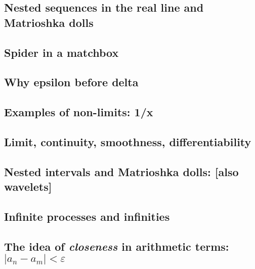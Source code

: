 \documentclass[
  a4paper,
]{article}
\begin{document}
\subsection{Nested sequences in the real line and Matrioshka
dolls}\label{nested-sequences-in-the-real-line-and-matrioshka-dolls}

\subsection{Spider in a matchbox}\label{spider-in-a-matchbox}

\subsection{Why epsilon before delta}\label{why-epsilon-before-delta}

\subsection{Examples of non-limits:
1/x}\label{examples-of-non-limits-1x}

\subsection{Limit, continuity, smoothness,
differentiability}\label{limit-continuity-smoothness-differentiability}

\subsection{Nested intervals and Matrioshka dolls: {[}also
wavelets{]}}\label{nested-intervals-and-matrioshka-dolls-also-wavelets}

\subsection{Infinite processes and
infinities}\label{infinite-processes-and-infinities}

\subsection{\texorpdfstring{The idea of \emph{closeness} in arithmetic
terms:
\(| a_n - a_m | < \varepsilon\)}{The idea of closeness in arithmetic terms: \textbar{} a\_n - a\_m \textbar{} \textless{} \textbackslash varepsilon}}\label{the-idea-of-closeness-in-arithmetic-terms-a_n---a_m-varepsilon}
\end{document}
